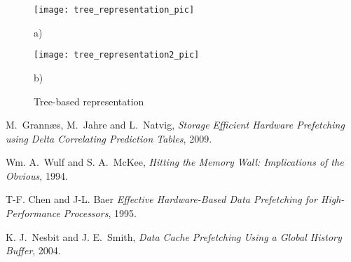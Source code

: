 \documentclass[12pt,journal,compsoc]{IEEEtran}
\begin{document}
\begin{figure}
\begin{center}
\texttt{[image: tree\_representation\_pic]}

a)
\end{center}
\begin{center}
\texttt{[image: tree\_representation2\_pic]}

b)
\end{center}
\caption{\label{fig:DG} Tree-based representation}
\end{figure}

\ifCLASSOPTIONcompsoc
\else
\fi


\ifCLASSOPTIONcaptionsoff
  \newpage
\fi



\begin{thebibliography}{1}

M.~Grann\ae s, M.~Jahre and L.~Natvig, \emph{Storage Efficient Hardware Prefetching using Delta Correlating Prediction Tables}, 2009.

Wm. A.~Wulf and S. A.~McKee, \emph{Hitting the Memory Wall: Implications of the
Obvious}, 1994.

T-F. Chen and J-L. Baer \emph{Effective Hardware-Based Data Prefetching for
High-Performance Processors}, 1995.

K. J.~Nesbit and J. E.~Smith, \emph{Data Cache Prefetching Using a Global History
Buffer}, 2004.

\end{thebibliography}



\end{document}
